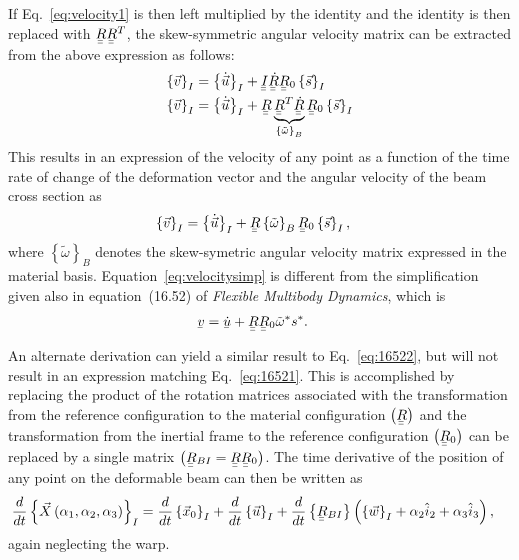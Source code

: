 \documentclass[a4paper]{article}
\newcommand{\ubar}[1]{\underaccent{\bar}{#1}}
\begin{document}
If Eq.~\eqref{eq:velocity1} is then left multiplied by the identity and the identity is then replaced with $\ubar{\ubar{R}}\ubar{\ubar{R}}^{T}$, the skew-symmetric angular velocity matrix can be extracted from the above expression as follows:
\begin{align}
  \left\{ \vec{v} \right\}_{I} 
  &=  \left\{ \dot{ \vec{u}}\right\}_{I}
  + \ubar{\ubar{I}} \ubar{\ubar{\dot{R}}} \ubar{\ubar{R}}_{0} \left\{ \vec{s} \right\}_{I}  \\
  \left\{ \vec{v} \right\}_{I} 
  &=  \left\{ \dot{ \vec{u}}\right\}_{I} + \ubar{\ubar{R}} 
  \underbrace{\ubar{\ubar{R}}^{T} \ubar{\ubar{\dot{R}}}}_{\left\{ \tilde{\omega} \right\}_{B}} \ubar{\ubar{R}}_{0} \left\{ \vec{s} \right\}_{I}  
\end{align}
This results in an expression of the velocity of any point as a function of the time rate of change of the deformation vector and the angular velocity of the beam cross section as   
\begin{align}
  \left\{ \vec{v} \right\}_{I}
  &= \left\{ \dot{ \vec{u}}\right\}_{I}
  + \ubar{\ubar{R}} \left\{ \tilde{\omega} \right\}_{B} \ubar{\ubar{R}}_{0}  \left\{ \vec{s} \right\}_{I},
  \label{eq:velocitysimp}
\end{align}
where $\left\{ \tilde{\omega} \right\}_{B}$ denotes the skew-symetric angular velocity matrix expressed in the material basis.  Equation~\eqref{eq:velocitysimp} is different from the simplification given also in equation~(16.52) of \textit{Flexible Multibody Dynamics}, which is
\begin{align}
  \ubar{v} &= \ubar{\dot{u}} + \ubar{\ubar{R}} \ubar{\ubar{R}}_{0} \tilde{\omega}^{*}s^{*}.
  \label{eq:16522}
\end{align}

An alternate derivation can yield a similar result to Eq.~\eqref{eq:16522}, but will not result in an expression matching Eq.~\eqref{eq:16521}.  This is accomplished by replacing the product of the rotation matrices associated with the transformation from the reference configuration to the material configuration $\left( \ubar{\ubar{R}} \right)$ and the transformation from the inertial frame to the reference configuration $\left( \ubar{\ubar{R}}_{0} \right)$ can be replaced by a single matrix $\left( \ubar{\ubar{R}}_{BI} = \ubar{\ubar{R}}\ubar{\ubar{R}}_{0} \right)$.  The time derivative of the position of any point on the deformable beam can then be written as
\begin{align}
  \frac{d}{dt}\left\{ \vec{X}\left( \alpha_{1}, \alpha_{2}, \alpha_{3} \right) \right\}_{I}  
  &= \frac{d}{dt} \left\{ \vec{x}_{0} \right\}_{I} 
  + \frac{d}{dt} \left\{ \vec{u} \right\}_{I} 
  + \frac{d}{dt} \left\{ \ubar{\ubar{R}}_{BI} \right\}
  \left( \left\{ \vec{w} \right\}_{I} + \alpha_{2} \hat{i}_{2} + \alpha_{3} \hat{i}_{3} \right), 
  \label{eq:DdefDt2}
\end{align}
again neglecting the warp.  
\end{document}
